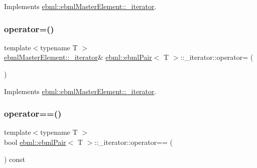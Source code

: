 Implements \mbox{\hyperlink{classebml_1_1ebmlMasterElement_1_1__iterator_ab77210fd0e481e1bb5b8563f7bd8142b}{ebml\+::ebml\+Master\+Element\+::\+\_\+iterator}}.

\mbox{\label{classebml_1_1ebmlPair_1_1__iterator_a2a77d98449db2fb4840d122f15da99be}} 
\subsubsection{\texorpdfstring{operator=()}{operator=()}}
{\footnotesize\ttfamily template$<$typename T $>$ \\
\mbox{\hyperlink{classebml_1_1ebmlMasterElement_1_1__iterator}{ebml\+Master\+Element\+::\+\_\+iterator}}\& \mbox{\hyperlink{classebml_1_1ebmlPair}{ebml\+::ebml\+Pair}}$<$ T $>$\+::\+\_\+iterator\+::operator= (\begin{DoxyParamCaption}\item[{const \mbox{\hyperlink{classebml_1_1ebmlMasterElement_1_1__iterator}{ebml\+Master\+Element\+::\+\_\+iterator}} \&}]{ }\end{DoxyParamCaption})\hspace{0.3cm}{\ttfamily [virtual]}}



Implements \mbox{\hyperlink{classebml_1_1ebmlMasterElement_1_1__iterator_a849c5027957fa1a022de0417aea1ad9e}{ebml\+::ebml\+Master\+Element\+::\+\_\+iterator}}.

\mbox{\label{classebml_1_1ebmlPair_1_1__iterator_a82853adf042b58f9432861852b33ac64}} 
\subsubsection{\texorpdfstring{operator==()}{operator==()}}
{\footnotesize\ttfamily template$<$typename T $>$ \\
bool \mbox{\hyperlink{classebml_1_1ebmlPair}{ebml\+::ebml\+Pair}}$<$ T $>$\+::\+\_\+iterator\+::operator== (\begin{DoxyParamCaption}\item[{const \mbox{\hyperlink{classebml_1_1ebmlMasterElement_1_1__iterator}{ebml\+Master\+Element\+::\+\_\+iterator}} \&}]{ }\end{DoxyParamCaption}) const\hspace{0.3cm}{\ttfamily [virtual]}}




